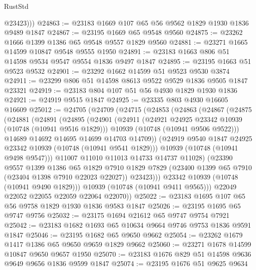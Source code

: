 \begin{lexlean}{RustStd}
\begin{coremodule}
{\begin{coremodule}
{{{{{          @23423)))
@24863 := @23183 @1669 @107 @65 @56 @9562 @1829 @1930 @1836 @9489 @1847
@24867 := @23195 @1669 @65 @9548 @9560
@24875 := @23262 @1666 @1399 @1386 @65 @9548 @9557 @1829 @9560
@24881 := @23271 @1665 @14599 @10847 @9548 @9555 @1950
@24891 := @23183 @1663 @806 @51 @14598 @9534 @9547 @9554 @1836 @9497 @1847
@24895 := @23195 @1663 @51 @9523 @9532
@24901 := @23292 @1662 @14599 @51 @9523 @9530 @3874
@24911 := @23299 @806 @51 @14598 @8613 @9522 @9529 @1836 @9505 @1847 @23321
@24919 := @23183 @804 @107 @51 @56 @4930 @1829 @1930 @1836
@24921 := @24919 @9515 @1847
@24925 := @23335 @803 @4930 @16605 @16609
@25012 := @24705
    (@24709
      (@24715
        (@24853
          (@24863
            (@24867
              (@24875
                (@24881
                  (@24891
                    (@24895
                      (@24901
                        (@24911
                          (@24921 @24925 @23342 @10939 (@10748 (@10941 @9516 @1829)))
                          @10939
                          (@10748 (@10941 @9506 @9522)))
                        @14689
                        @14692
                        @14695
                        @14699
                        @14703
                        @14709))
                    (@24919 @9540 @1847 @24925 @23342 @10939 (@10748 (@10941 @9541 @1829)))
                    @10939
                    (@10748 (@10941 @9498 @9547)))
                  @11007
                  @11010
                  @11013
                  @14733
                  @14737
                  @11028)
                (@23390
                  @9557
                  @1399
                  @1386
                  @65
                  @1829
                  @7910
                  @1829
                  @7829
                  (@23400 @1399 @65 @7910 (@23404 @1398 @7910 @22023 @22027))
                  @23423)))
            @23342
            @10939
            (@10748 (@10941 @9490 @1829)))
          @10939
          (@10748 (@10941 @9411 @9565)))
        @22049
        @22052
        @22055
        @22059
        @22064
        @22070))
@25022 := @23183 @1695 @107 @65 @56 @9758 @1829 @1930 @1836 @9583 @1847
@25026 := @23195 @1695 @65 @9747 @9756
@25032 := @23175 @1694 @21612 @65 @9747 @9754 @7921
@25042 := @23183 @1682 @1693 @65 @10634 @9664 @9746 @9753 @1836 @9591 @1847
@25046 := @23195 @1682 @65 @9650 @9662
@25054 := @23262 @1679 @1417 @1386 @65 @9650 @9659 @1829 @9662
@25060 := @23271 @1678 @14599 @10847 @9650 @9657 @1950
@25070 := @23183 @1676 @829 @51 @14598 @9636 @9649 @9656 @1836 @9599 @1847
@25074 := @23195 @1676 @51 @9625 @9634
}}}}}
\end{coremodule}}
\end{coremodule}
\end{lexlean}
